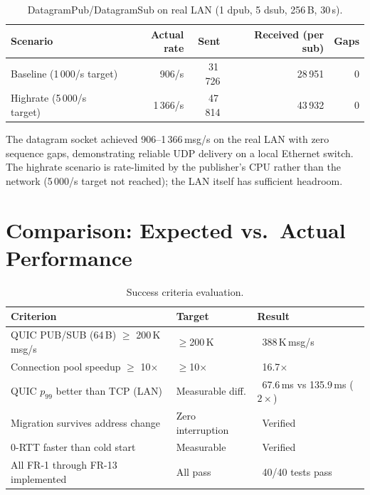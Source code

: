 \documentclass[12pt, a4paper, oneside]{report}
\newcommand{\cmark}{\ding{51}}
\begin{document}
\begin{table}[H]
  \centering
  \caption{DatagramPub/DatagramSub on real LAN (1 dpub, 5 dsub, 256\,B, 30\,s).}
  \label{tab:phys-datagram}
  \begin{tabular}{lrrrr}
    \toprule
    \textbf{Scenario} & \textbf{Actual rate} & \textbf{Sent} & \textbf{Received (per sub)} & \textbf{Gaps} \\
    \midrule
    Baseline (1\,000/s target) & 906/s & 31\,726 & 28\,951 & 0 \\
    Highrate (5\,000/s target) & 1\,366/s & 47\,814 & 43\,932 & 0 \\
    \bottomrule
  \end{tabular}
\end{table}

The datagram socket achieved 906--1\,366\,msg/s on the real LAN with zero sequence gaps, demonstrating reliable UDP delivery on a local Ethernet switch. The highrate scenario is rate-limited by the publisher's CPU rather than the network (5\,000/s target not reached); the LAN itself has sufficient headroom.

\section{Comparison: Expected vs.\ Actual Performance}
\label{sec:comparison}

\begin{table}[H]
  \centering
  \caption{Success criteria evaluation.}
  \label{tab:criteria}
  \begin{tabular}{lll}
    \toprule
    \textbf{Criterion} & \textbf{Target} & \textbf{Result} \\
    \midrule
    QUIC PUB/SUB (64\,B) $\geq$ 200\,K\,msg/s & $\geq$200\,K & \cmark\ 388\,K\,msg/s \\
    Connection pool speedup $\geq$ 10$\times$  & $\geq$10$\times$ & \cmark\ 16.7$\times$ \\
    QUIC $p_{99}$ better than TCP (LAN)       & Measurable diff. & \cmark\ 67.6\,ms vs 135.9\,ms ($2{\times}$) \\
    Migration survives address change          & Zero interruption & \cmark\ Verified \\
    0-RTT faster than cold start              & Measurable   & \cmark\ Verified \\
    All FR-1 through FR-13 implemented        & All pass     & \cmark\ 40/40 tests pass \\
    \bottomrule
  \end{tabular}
\end{table}
\end{document}
